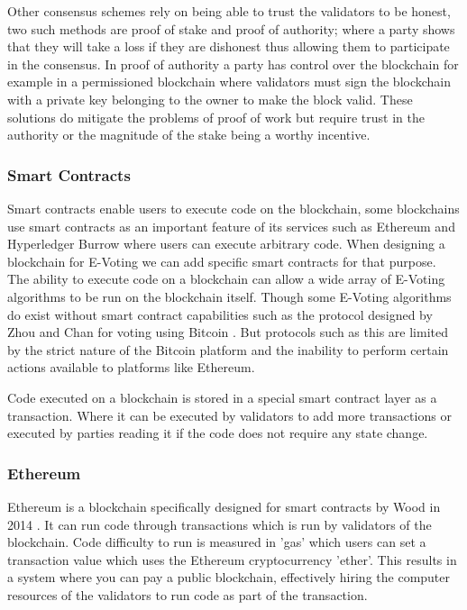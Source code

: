 \documentclass{entcs}
\begin{document}
Other consensus schemes rely on being able to trust the validators to be honest, two such methods are proof of stake and proof of authority\cite{blockchainBeginners}\cite{baliga2017understanding}; where a party shows that they will take a loss if they are dishonest thus allowing them to participate in the consensus. In proof of authority a party has control over the blockchain for example in a permissioned blockchain where validators must sign the blockchain with a private key belonging to the owner to make the block valid. These solutions do mitigate the problems of proof of work but require trust in the authority or the magnitude of the stake being a worthy incentive.

\subsubsection{Smart Contracts}
Smart contracts enable users to execute code on the blockchain, some blockchains use smart contracts as an important feature of its services such as Ethereum \cite{wood2014ethereum} and Hyperledger Burrow \cite{HyperLedgerBurrow} where users can execute arbitrary code. When designing a blockchain for E-Voting we can add specific smart contracts for that purpose. The ability to execute code on a blockchain can allow a wide array of E-Voting algorithms to be run on the blockchain itself. Though some E-Voting algorithms do exist without smart contract capabilities such as the protocol designed by Zhou and Chan for voting using Bitcoin \cite{zhao2015vote}. But protocols such as this are limited by the strict nature of the Bitcoin platform and the inability to perform certain actions available to platforms like Ethereum.

Code executed on a blockchain is stored in a special smart contract layer as a transaction. Where it can be executed by validators to add more transactions or executed by parties reading it if the code does not require any state change.

\subsubsection{Ethereum}
Ethereum is a blockchain specifically designed for smart contracts by Wood in 2014 \cite{wood2014ethereum}. It can run code through transactions which is run by validators of the blockchain. Code difficulty to run is measured in 'gas' which users can set a transaction value which uses the Ethereum cryptocurrency 'ether'. This results in a system where you can pay a public blockchain, effectively hiring the computer resources of the validators to run code as part of the transaction.
\end{document}
